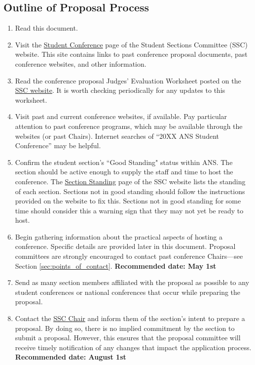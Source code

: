 \documentclass[12pt]{article}
\begin{document}
\subsection{Outline of Proposal Process}
\begin{enumerate}
\item{Read this document.}
\item{Visit the \href{http://students.ans.org/student-conferences/}{Student Conference} page of the Student Sections Committee (SSC) website. This site contains links to past conference proposal documents, past conference websites, and other information.}
\item{Read the conference proposal Judges’ Evaluation Worksheet posted on the \href{http://students.ans.org/student-conferences/}{SSC website}. It is worth checking periodically for any updates to this worksheet.}
\item{Visit past and current conference websites, if available. Pay particular attention to past conference programs, which may be available through the websites (or past Chairs). Internet searches of ``20XX ANS Student Conference” may be helpful.}
\item{Confirm the student section's ``Good Standing" status within ANS. The section should be active enough to supply the staff and time to host the conference. The \href{http://students.ans.org/section-standing/}{Section Standing} page of the SSC website lists the standing of each section. Sections not in good standing should follow the instructions provided on the website to fix this. Sections not in good standing for some time should consider this a warning sign that they may not yet be ready to host.}
\item{Begin gathering information about the practical aspects of hosting a conference. Specific details are provided later in this document. Proposal committees are strongly encouraged to contact past conference Chairs---see Section \ref{sec:points_of_contact}. \textbf{Recommended date: May 1st}}
\item{Send as many section members affiliated with the proposal as possible to any student conferences or national conferences that occur while preparing the proposal.}
\item{Contact the \href{mailto:sscChair@gmail.com}{SSC Chair} and inform them of the section’s intent to prepare a proposal. By doing so, there is no implied commitment by the section to submit a proposal. However, this ensures that the proposal committee will receive timely notification of any changes that impact the application process. \textbf{Recommended date: August 1st}}

\end{enumerate}
\end{document}
